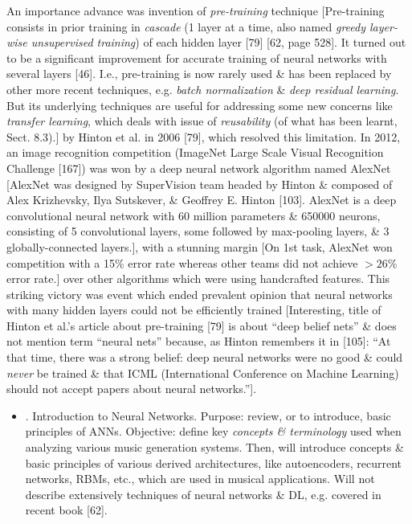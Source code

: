\documentclass{article}
\begin{document}
\begin{itemize}
	An importance advance was invention of {\it pre-training} technique [Pre-training consists in prior training in {\it cascade} (1 layer at a time, also named {\it greedy layer-wise unsupervised training}) of each hidden layer [79] [62, page 528]. It turned out to be a significant improvement for accurate training of neural networks with several layers [46]. I.e., pre-training is now rarely used \& has been replaced by other more recent techniques, e.g. {\it batch normalization} \& {\it deep residual learning}. But its underlying techniques are useful for addressing some new concerns like {\it transfer learning}, which deals with issue of {\it reusability} (of what has been learnt, Sect. 8.3).] by Hinton et al. in 2006 [79], which resolved this limitation. In 2012, an image recognition competition (ImageNet Large Scale Visual Recognition Challenge [167]) was won by a deep neural network algorithm named AlexNet [AlexNet was designed by SuperVision team headed by {\sc Hinton} \& composed of {\sc Alex Krizhevsky, Ilya Sutskever, \& Geoffrey E. Hinton} [103]. AlexNet is a deep convolutional neural network with 60 million parameters \& 650000 neurons, consisting of 5 convolutional layers, some followed by max-pooling layers, \& 3 globally-connected layers.], with a stunning margin [On 1st task, AlexNet won competition with a 15\% error rate whereas other teams did not achieve $> 26$\% error rate.] over other algorithms which were using handcrafted features. This striking victory was event which ended prevalent opinion that neural networks with many hidden layers could not be efficiently trained [Interesting, title of Hinton et al.'s article about pre-training [79] is about ``deep belief nets'' \& does not mention term ``neural nets'' because, as {\sc Hinton} remembers it in [105]: ``At that time, there was a strong belief: deep neural networks were no good \& could {\it never} be trained \& that ICML (International Conference on Machine Learning) should not accept papers about neural networks.''].
	\begin{itemize}
		\item {. Introduction to Neural Networks.} Purpose: review, or to introduce, basic principles of ANNs. Objective: define key {\it concepts \& terminology} used when analyzing various music generation systems. Then, will introduce concepts \& basic principles of various derived architectures, like autoencoders, recurrent networks, RBMs, etc., which are used in musical applications. Will not describe extensively techniques of neural networks \& DL, e.g. covered in recent book [62].

\end{itemize}
\end{itemize}
\end{document}
